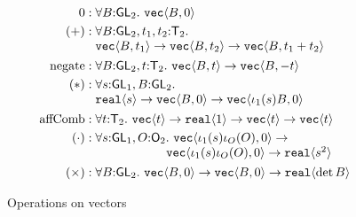 \begin{figure}[t]
  \centering
  \begin{align*}
    0 & : \forall B \mathord: \SynGL{2}.\ \tyPrim{vec}{B,0} \\
    (+) & :
    \begin{array}[t]{@{}l}
      \forall B \mathord: \SynGL{2}, t_1,t_2 \mathord: \SynTransl{2}. \\
      \tyPrim{vec}{B,t_1} \to \tyPrim{vec}{B,t_2} \to
      \tyPrim{vec}{B,t_1 + t_2}
    \end{array}
    \\
    \mathrm{negate} & : \forall B \mathord: \SynGL{2}, t \mathord: \SynTransl{2}.\ \tyPrim{vec}{B,t} \to \tyPrim{vec}{B,-t} \\
  (*) & : 
  \begin{array}[t]{@{}l}
    \forall s \mathord: \SynGL{1}, B \mathord:\SynGL{2}.\ \\
    \tyPrim{real}{s} \to \tyPrim{vec}{B,0} \to \tyPrim{vec}{\iota_1(s)B,0}
  \end{array}\\
    \mathrm{affComb} &:
    \begin{array}[t]{@{}l}\forall t \mathord:
    \SynTransl{2}.\ \tyPrim{vec}{t} \to \tyPrim{real}{1} \to
    \tyPrim{vec}{t} \to \tyPrim{vec}{t}
    \end{array} \\
    (\cdot) & :
\begin{array}[t]{@{}l}
    \forall s \mathord: \SynGL{1}, O \mathord: \SynOrth{2}.\ \tyPrim{vec}{\iota_1(s)\iota_O(O),0} \to\\
    \hspace{2cm}\tyPrim{vec}{\iota_1(s)\iota_O(O),0}\to \tyPrim{real}{s^2}
\end{array}\\
  (\times) & : \forall B \mathord: \SynGL{2}.\ \tyPrim{vec}{B,0} \to
  \tyPrim{vec}{B,0} \to \tyPrim{real}{\det B} 
\end{align*}
  \caption{Operations on vectors}
  \label{fig:vec-ops}
\end{figure}



